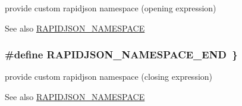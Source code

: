 provide custom rapidjson namespace (opening expression) 

\begin{DoxySeeAlso}{See also}
\hyperlink{group___r_a_p_i_d_j_s_o_n___c_o_n_f_i_g_ga743a79d3af927391fe3eb5c979136899}{R\+A\+P\+I\+D\+J\+S\+O\+N\+\_\+\+N\+A\+M\+E\+S\+P\+A\+CE} 
\end{DoxySeeAlso}
\subsubsection[{\texorpdfstring{R\+A\+P\+I\+D\+J\+S\+O\+N\+\_\+\+N\+A\+M\+E\+S\+P\+A\+C\+E\+\_\+\+E\+ND}{RAPIDJSON_NAMESPACE_END}}]{\setlength{\rightskip}{0pt plus 5cm}\#define R\+A\+P\+I\+D\+J\+S\+O\+N\+\_\+\+N\+A\+M\+E\+S\+P\+A\+C\+E\+\_\+\+E\+ND~\}}\hypertarget{group___r_a_p_i_d_j_s_o_n___c_o_n_f_i_g_gaf18f052a98b9f5df5448d39484b743c1}{}\label{group___r_a_p_i_d_j_s_o_n___c_o_n_f_i_g_gaf18f052a98b9f5df5448d39484b743c1}


provide custom rapidjson namespace (closing expression) 

\begin{DoxySeeAlso}{See also}
\hyperlink{group___r_a_p_i_d_j_s_o_n___c_o_n_f_i_g_ga743a79d3af927391fe3eb5c979136899}{R\+A\+P\+I\+D\+J\+S\+O\+N\+\_\+\+N\+A\+M\+E\+S\+P\+A\+CE} 
\end{DoxySeeAlso}
